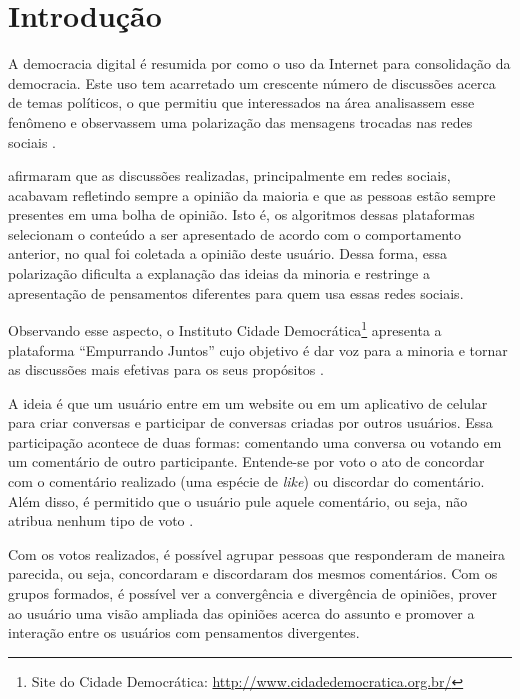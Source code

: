 \chapter[Introdução]{Introdução} \label{cap:introducao}

A democracia digital é resumida por  como o uso da Internet para consolidação da democracia.
Este uso tem acarretado um crescente número de discussões acerca de temas políticos, o que permitiu que interessados na área analisassem esse fenômeno e observassem uma polarização das mensagens trocadas nas redes sociais \cite{empurrandojuntos}.

 afirmaram que as discussões realizadas, principalmente em redes sociais, 
acabavam refletindo sempre a opinião da maioria e que as pessoas estão sempre presentes em uma bolha de opinião. 
Isto é, os algoritmos dessas plataformas selecionam o conteúdo a ser apresentado de acordo com o comportamento anterior,
no qual foi coletada a opinião deste usuário.
Dessa forma, essa polarização dificulta a explanação das ideias da minoria e restringe a apresentação de pensamentos diferentes para quem usa essas redes sociais. 

Observando esse aspecto, o Instituto Cidade Democrática\footnote{Site do Cidade Democrática: \url{http://www.cidadedemocratica.org.br/}} 
apresenta a plataforma ``Empurrando Juntos'' cujo objetivo 
é dar voz para a minoria e tornar as discussões mais efetivas para os seus propósitos \cite{empurrandojuntos}.

A ideia é que um usuário entre em um website ou em um aplicativo de celular para criar conversas e 
participar de conversas criadas por outros usuários. Essa participação 
acontece de duas formas: comentando uma conversa ou votando em um comentário de outro participante. Entende-se por voto
o ato de concordar com o comentário realizado (uma espécie de \textit{like}) ou discordar do comentário. Além disso, é permitido
que o usuário pule aquele comentário, ou seja, não atribua nenhum tipo de voto \cite{empurrandojuntos}. 

Com os votos realizados, é possível agrupar pessoas que responderam de maneira parecida, ou seja, concordaram e
discordaram dos mesmos comentários. Com os grupos formados, é possível ver a convergência e divergência de opiniões, 
prover ao usuário uma visão ampliada das opiniões acerca do assunto e promover a interação entre os usuários com 
pensamentos divergentes.

